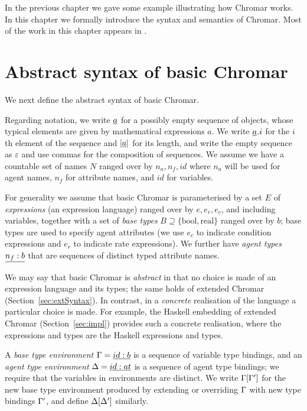 In the previous chapter we gave some example illustrating how Chromar works. In
this chapter we formally introduce the syntax and semantics of Chromar.  Most of
the work in this chapter appears in \citet{}.

\section{Abstract syntax of basic Chromar}
\label{sec:syntax}
We next define the abstract syntax of basic Chromar.

Regarding notation, we write $\underline{a}$ for a possibly empty sequence of objects,
whose typical elements are given by mathematical expressions $a$. We write
$\underline{a}.i$ for the $i$th element of the sequence and $|\underline{a}|$ for its length,
and write the empty sequence as $\varepsilon$ and use commas for the composition
of sequences.  We assume we have a countable set of names $N$ ranged over by
$n_a, n_f, id$ where $n_a$ will be used for agent names, $n_f$ for attribute
names, and $id$ for variables.

For generality we assume that basic Chromar is parameterised by a set $E$ of
\emph{expressions} (an expression language) ranged over by $e, e_r, e_c$, and
including variables, together with a set of \emph{base types}
$B \supseteq \{\mathrm{bool}, \mathrm{real} \}$ ranged over by $b$; base types are used to
specify agent attributes (we use $e_c$ to indicate condition expressions and
$e_r$ to indicate rate expressions).
%
We further have \emph{agent types} $\underline{n_f:b}$ that are sequences of distinct
typed attribute names.

We may say that basic Chromar is \emph{abstract} in that no choice is made of an
expression language and its types; the same holds of extended Chromar
(Section~\ref{sec:extSyntax}).  In contrast, in a \emph{concrete} realisation of
the language a particular choice is made.  For example, the Haskell embedding of
extended Chromar (Section~\ref{sec:impl}) provides such a concrete realisation,
where the expressions and types are the Haskell expressions and types.

A \emph{base type environment} $\Gamma = \underline{id:b}$ is a sequence of variable type
bindings, and an \emph{agent type environment} $\Delta = \underline{id:at}$ is a sequence of
agent type bindings; we require that the variables in environments are distinct.
We write $\Gamma[\Gamma']$ for the new base type environment produced by extending or
overriding $\Gamma$ with new type bindings $\Gamma'$, and define $\Delta[\Delta']$ similarly.

